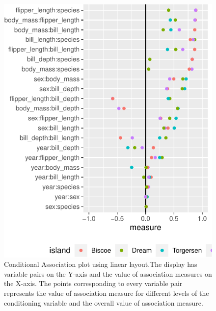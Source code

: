 \begin{Schunk}
\begin{figure}

{\centering \includegraphics{rj_paper_files/figure-latex/linear-cond-assoc-1} 

}

\caption[Conditional Association plot using linear layout.The display has variable pairs on the Y-axis and the value of association measures on the X-axis]{Conditional Association plot using linear layout.The display has variable pairs on the Y-axis and the value of association measures on the X-axis. The points corresponding to every variable pair represents the value of association measure for different levels of the conditioning variable and the overall value of association measure.}\label{fig:linear-cond-assoc}
\end{figure}
\end{Schunk}



\address{%
Amit Chinwan\\
Maynooth University\\%
Hamilton Institute\\ Maynooth, Ireland\\
%
%
%
\href{mailto:amit.chinwan.2019@mumail.ie}{\nolinkurl{amit.chinwan.2019@mumail.ie}}%
}

\address{%
Catherine Hurley\\
Maynooth University\\%
Department of Mathematics and Statistics\\ Maynooth, Ireland\\
%
%
%
\href{mailto:catherine.hurley@mu.ie}{\nolinkurl{catherine.hurley@mu.ie}}%
}
